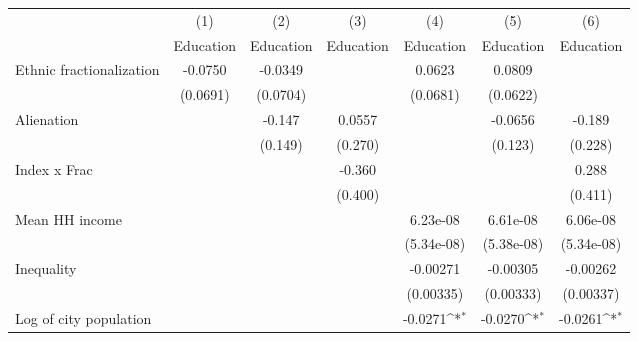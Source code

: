 {
\def\sym#1{\ifmmode^{#1}\else\(^{#1}\)\fi}
\begin{tabular}{l*{6}{c}}
\hline\hline
                    &\multicolumn{1}{c}{(1)}&\multicolumn{1}{c}{(2)}&\multicolumn{1}{c}{(3)}&\multicolumn{1}{c}{(4)}&\multicolumn{1}{c}{(5)}&\multicolumn{1}{c}{(6)}\\
                    &\multicolumn{1}{c}{Education}&\multicolumn{1}{c}{Education}&\multicolumn{1}{c}{Education}&\multicolumn{1}{c}{Education}&\multicolumn{1}{c}{Education}&\multicolumn{1}{c}{Education}\\
\hline
Ethnic fractionalization&     -0.0750         &     -0.0349         &                     &      0.0623         &      0.0809         &                     \\
                    &    (0.0691)         &    (0.0704)         &                     &    (0.0681)         &    (0.0622)         &                     \\
[1em]
Alienation          &                     &      -0.147         &      0.0557         &                     &     -0.0656         &      -0.189         \\
                    &                     &     (0.149)         &     (0.270)         &                     &     (0.123)         &     (0.228)         \\
[1em]
Index x Frac        &                     &                     &      -0.360         &                     &                     &       0.288         \\
                    &                     &                     &     (0.400)         &                     &                     &     (0.411)         \\
[1em]
Mean HH income      &                     &                     &                     &    6.23e-08         &    6.61e-08         &    6.06e-08         \\
                    &                     &                     &                     &  (5.34e-08)         &  (5.38e-08)         &  (5.34e-08)         \\
[1em]
Inequality          &                     &                     &                     &    -0.00271         &    -0.00305         &    -0.00262         \\
                    &                     &                     &                     &   (0.00335)         &   (0.00333)         &   (0.00337)         \\
[1em]
Log of city population&                     &                     &                     &     -0.0271\sym{*}  &     -0.0270\sym{*}  &     -0.0261\sym{*}  \\

\end{tabular}}
